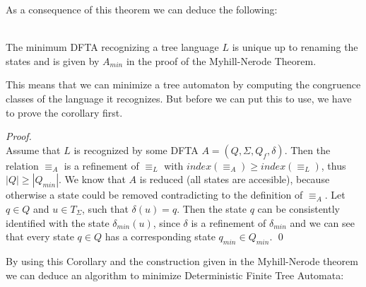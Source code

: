 \documentclass{llncs}
\begin{document}
\pagebreak

As a consequence of this theorem we can deduce the following:

\begin{corollary} \cite{tata-nfta}\\
	The minimum DFTA recognizing a tree language \(L\) is unique up to renaming the states and is given by \(A_{min}\) in the proof of the Myhill-Nerode Theorem.
\end{corollary}

This means that we can minimize a tree automaton by computing the congruence classes of the language it recognizes. But before we can put this to use, we have to prove the corollary first.

\begin{proof} {~} \cite{tata-nfta}\\
	Assume that \(L\) is recognized by some DFTA \(A = (Q, \Sigma, Q_f, \delta)\). Then the relation \(\equiv_A\) is a refinement of \(\equiv_L\) with \(index(\equiv_A) \geq index(\equiv_L)\), thus \(|Q| \geq |Q_{min}|\). We know that \(A\) is reduced (all states are accesible), because otherwise a state could be removed contradicting to the definition of \(\equiv_A\). Let \(q \in Q\) and \(u \in T_\Sigma\), such that \(\delta(u) = q\). Then the state \(q\) can be consistently identified with the state \(\delta_{min}(u)\), since \(\delta\) is a refinement of \(\delta_{min}\) and we can see that every state \(q \in Q\) has a corresponding state \(q_{min} \in Q_{min}\).
	\qed
\end{proof}

By using this Corollary and the construction given in the Myhill-Nerode theorem we can deduce an algorithm to minimize Deterministic Finite Tree Automata:
\end{document}

